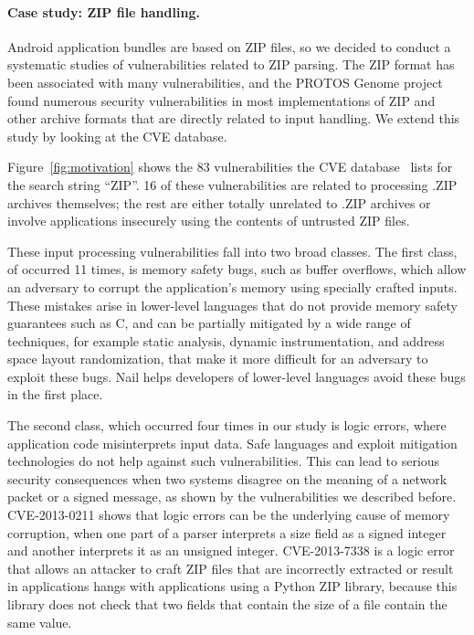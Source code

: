 \paragraph{Case study: ZIP file handling.}

Android application bundles are based on ZIP files, so we decided to conduct a systematic studies of
vulnerabilities related to ZIP parsing.  
The ZIP format has been associated with many vulnerabilities, and the
PROTOS Genome project~\cite{protoc-c10-archive} found numerous security vulnerabilities in most
implementations of ZIP and other archive formats that are directly
related to input handling. We extend this study by looking at the CVE database.


Figure~\ref{fig:motivation} shows  the 83 vulnerabilities the CVE database~\cite{cve-database} lists
 for the search string ``ZIP''. 16 of these vulnerabilities are related to processing .ZIP archives
 themselves; the rest are either totally unrelated to .ZIP archives or involve applications insecurely using
 the contents of untrusted ZIP files.


These input processing vulnerabilities fall into two broad classes.  The first
class, of occurred 11 times, is memory safety bugs, such as buffer overflows, which allow an
adversary to corrupt the application's memory using specially crafted
inputs.  These mistakes arise in lower-level languages that do not
provide memory safety guarantees such as C, and can be partially
mitigated by a wide range of techniques, for example static analysis,
dynamic instrumentation, and address space layout randomization, that
make it more difficult for an adversary to exploit these bugs.
Nail helps developers of lower-level languages avoid these bugs
in the first place.

The second class, which occurred four times in our study is logic errors, where application code
misinterprets input data. Safe languages and exploit mitigation technologies do not help against
such vulnerabilities. This can lead to serious security consequences when two systems disagree on
the meaning of a network packet or a signed message, as shown by the vulnerabilities we described
before. CVE-2013-0211 shows that logic errors can be the underlying cause of memory corruption, when
one part of a parser interprets a size field as a signed integer and another interprets it as an
unsigned integer. CVE-2013-7338 is a logic error that allows an attacker to craft ZIP files that are
incorrectly extracted or result in applications hangs with applications using a Python ZIP library,
because this library does not check that two fields that contain the size of a file contain the same value.

